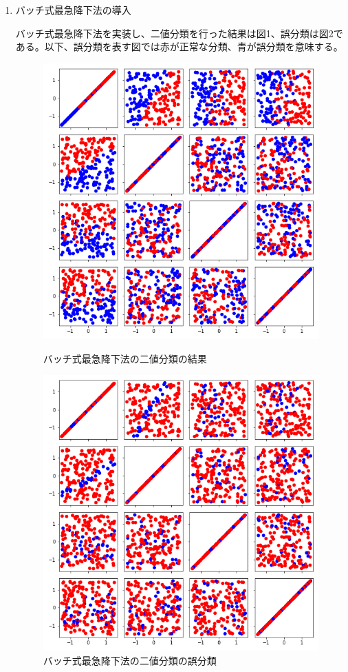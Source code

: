 \documentclass{jsarticle}
\begin{document}
\begin{enumerate}
  \item バッチ式最急降下法の導入
  
  バッチ式最急降下法を実装し、二値分類を行った結果は図1、誤分類は図2である。以下、誤分類を表す図では赤が正常な分類、青が誤分類を意味する。
  \begin{figure}[htbp]
    \centering
    \begin{minipage}{0.4\linewidth}
      \centering
      \includegraphics[width=.9\textwidth]{image/1-1-1.png}
    \caption{バッチ式最急降下法の二値分類の結果}
    \end{minipage}
    \begin{minipage}{0.4\linewidth}
      \centering
      \includegraphics[width=.9\textwidth]{image/1-1-2.png}
    \caption{バッチ式最急降下法の二値分類の誤分類}
    \end{minipage}
  \end{figure}


\end{enumerate}
\end{document}
